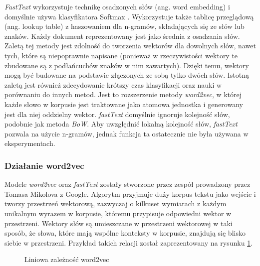 \textit{FastText} wykorzystuje technikę osadzonych słów (ang. word embedding) i domyślnie używa klasyfikatora Softmax \cite{walkowiak2018}. Wykorzystuje także tablicę przeglądową (ang. lookup table) z haszowaniem dla n-gramów, składających się ze słów lub znaków. Każdy dokument reprezentowany jest jako średnia z osadzania słów. Zaletą tej metody jest zdolność do tworzenia wektorów dla dowolnych słów, nawet tych, które są niepoprawnie napisane (ponieważ w rzeczywistości wektory te zbudowane są z podłańcuchów znaków w nim zawartych). Dzięki temu, wektory mogą być budowane na podstawie złączonych ze sobą tylko dwóch słów. Istotną zaletą jest również zdecydowanie krótszy czas klasyfikacji oraz nauki w porównaniu do innych metod. Jest to rozszerzenie metody \textit{word2vec}, w której każde słowo w korpusie jest traktowane jako atomowa jednostka i generowany jest dla niej oddzielny wektor. \cite{joulin2016bag}  \textit{fastText} domyślnie ignoruje kolejność słów, podobnie jak metoda \textit{BoW}. Aby uwzględnić lokalną kolejność słów, \textit{fastText} pozwala na użycie n-gramów, jednak funkcja ta ostatecznie nie była używana w eksperymentach.\cite{joulin2016fasttext}



\subsubsection{Działanie word2vec}
Modele \textit{word2vec} oraz \textit{fastText} zostały stworzone przez zespół prowadzony przez Tomasa Mikolova z Google. Algorytm przyjmuje duży korpus tekstu jako wejście i tworzy przestrzeń wektorową, \cite{nlp-from-scratch} zazwyczaj o kilkuset wymiarach z każdym unikalnym wyrazem w korpusie, któremu przypisuje odpowiedni wektor w przestrzeni. Wektory słów są umieszczane w przestrzeni wektorowej w taki sposób, że słowa, które mają wspólne konteksty w korpusie, znajdują się blisko siebie w przestrzeni. Przykład takich relacji został zaprezentowany na rysunku \ref{fig:word2vec-relation}. \cite{word2vec-google}

\begin{figure}[ht!]
	\centering
	\caption{Liniowa zależność word2vec}
	\label{fig:word2vec-relation}
\end{figure}

